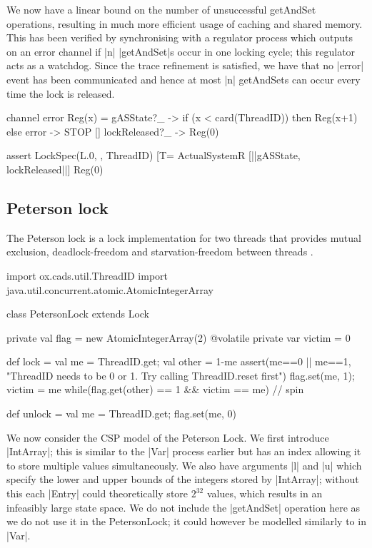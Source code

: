 We now have a linear bound on the number of unsuccessful getAndSet operations, resulting in much more efficient usage of caching and shared memory. This has been verified by synchronising with a regulator process which outputs on an error channel if |n| |getAndSet|s occur in one locking cycle; this regulator acts as a watchdog. Since the trace refinement is satisfied, we have that no |error| event has been communicated and hence at most |n| getAndSets can occur every time the lock is released. 

\begin{cspm}
channel error
Reg(x) =    gASState?_ -> if (x < card(ThreadID)) then Reg(x+1)
                          else error -> STOP
         [] lockReleased?_ -> Reg(0)

assert LockSpec(L.0, {}, ThreadID) 
         [T= ActualSystemR [|{|gASState, lockReleased|}|] Reg(0)
\end{cspm}

\subsection{Peterson lock}\label{section:peterson-lock}

The Peterson lock is a lock implementation for two threads that provides mutual exclusion, deadlock-freedom and starvation-freedom between threads \cite{Peterson}.

\begin{scala}[caption={The PetersonLock code, adapted from \cite{CADS}}]
import ox.cads.util.ThreadID
import java.util.concurrent.atomic.AtomicIntegerArray

class PetersonLock extends Lock{
  private val flag = new AtomicIntegerArray(2)
  @volatile private var victim = 0

  def lock = {
    val me = ThreadID.get; val other = 1-me 
    assert(me==0 || me==1, 
      "ThreadID needs to be 0 or 1.  Try calling ThreadID.reset first")
    flag.set(me, 1); victim = me
    while(flag.get(other) == 1 && victim == me){ } // spin
  }

  def unlock = { val me = ThreadID.get; flag.set(me, 0) }
}
\end{scala}

We now consider the CSP model of the Peterson Lock. We first introduce |IntArray|; this is similar to the |Var| process earlier but has an index allowing it to store multiple values simultaneously. We also have arguments |l| and |u| which specify the lower and upper bounds of the integers stored by |IntArray|; without this each |Entry| could theoretically store $2^{32}$ values, which results in an infeasibly large state space. We do not include the |getAndSet| operation here as we do not use it in the PetersonLock; it could however be modelled similarly to in |Var|.

